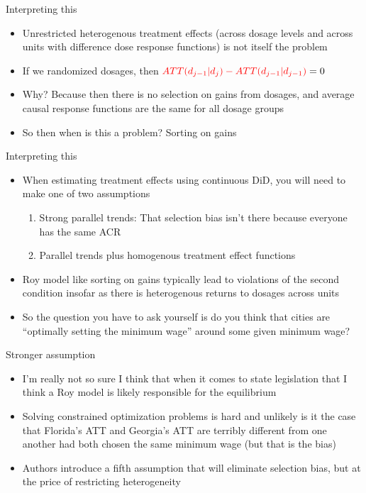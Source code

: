 \documentclass{beamer}
\begin{document}
\begin{frame}{Interpreting this}

\begin{itemize}
\item Unrestricted heterogenous treatment effects (across dosage levels and across units with difference dose response functions) is not itself the problem
\item If we randomized dosages, then $\textcolor{red}{ATT(d_{j-1} | d_j) - ATT(d_{j-1} | d_{j-1})}=0$
\item Why?  Because then there is no selection on gains from dosages, and average causal response functions are the same for all dosage groups
\item So then when is this a problem?  Sorting on gains
\end{itemize}

\end{frame}

\begin{frame}{Interpreting this}

\begin{itemize}

\item When estimating treatment effects using continuous DiD, you will need to make one of two assumptions
	\begin{enumerate}
	\item Strong parallel trends: That selection bias isn't there because everyone has the same ACR
	\item Parallel trends plus homogenous treatment effect functions
	\end{enumerate}
\item Roy model like sorting on gains typically lead to violations of the second condition insofar as there is heterogenous returns to dosages across units
\item So the question you have to ask yourself is do you think that cities are ``optimally setting the minimum wage'' around some given minimum wage?
\end{itemize}

\end{frame}

\begin{frame}{Stronger assumption}

\begin{itemize}

\item I'm really not so sure I think that when it comes to state legislation that I think a Roy model is likely responsible for the equilibrium
\item Solving constrained optimization problems is hard and unlikely is it the case that Florida's ATT and Georgia's ATT are terribly different from one another had both chosen the same minimum wage (but that is the bias)
\item Authors introduce a fifth assumption that will eliminate selection bias, but at the price of restricting heterogeneity

\end{itemize}

\end{frame}
\end{document}
